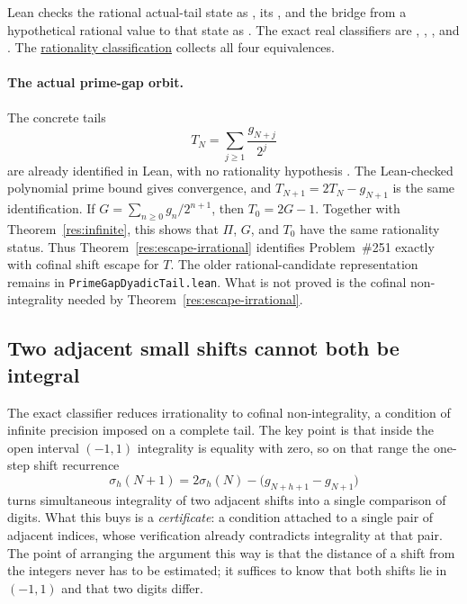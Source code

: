 \documentclass[11pt]{article}
\begin{document}
\noindent Lean checks the rational actual-tail state as
, its
,
and the bridge from a hypothetical rational value to that state as
.  The exact real classifiers are
,
,
, and
.  The \href{https://github.com/wcook04/plectis-erdos/blob/f36a98bf3d3e6f65f1074e3b800e3293d5b8a51a/ErdosProblems/Erdos251/PaperCoreR7.lean#L94}{rationality classification}
collects all four equivalences.

\paragraph{The actual prime-gap orbit.}
The concrete tails
\[
 T_N=\sum_{j\ge1}\frac{g_{N+j}}{2^j}
\]
are already identified in Lean, with no rationality hypothesis
.
The Lean-checked polynomial prime bound gives convergence, and
$T_{N+1}=2T_N-g_{N+1}$ is the same identification.  If
$G=\sum_{n\ge0}g_n/2^{n+1}$, then $T_0=2G-1$.  Together with
Theorem~\ref{res:infinite}, this shows that $\Pi$, $G$, and
$T_0$ have the same rationality status.  Thus
Theorem~\ref{res:escape-irrational} identifies Problem~\#251 exactly with
cofinal shift escape for $T$.  The older rational-candidate representation
remains in \texttt{PrimeGapDyadicTail.lean}.  What is not
proved is the cofinal non-integrality needed by
Theorem~\ref{res:escape-irrational}.

\subsection{Two adjacent small shifts cannot both be integral}\label{sec:local-certificate}

The exact classifier reduces irrationality to cofinal non-integrality, a
condition of infinite precision imposed on a complete tail.  The key
point is that inside the open interval $(-1,1)$ integrality is equality with
zero, so on that range the one-step shift recurrence
\[
 \sigma_h(N+1)=2\sigma_h(N)-\bigl(g_{N+h+1}-g_{N+1}\bigr)
\]
turns simultaneous integrality of two adjacent shifts into a single comparison
of digits.  What this buys is a \emph{certificate}: a condition attached to a
single pair of adjacent indices, whose verification already contradicts
integrality at that pair.  The point of arranging the argument this
way is that the distance of a shift from the integers never has to be
estimated; it suffices to know that both shifts lie in $(-1,1)$ and that two
digits differ.
\end{document}
